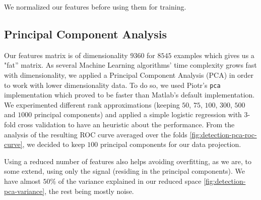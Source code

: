 \documentclass[10pt,a4paper]{article}
\begin{document}
  We normalized our features before using them for training.

  \subsection{Principal Component Analysis}
  Our features matrix is of dimensionality $9360$ for $8545$ examples which gives us a "fat'' matrix. As several Machine Learning algorithms' time complexity grows fast with dimensionality, we applied a Principal Component Analysis (PCA) in order to work with lower dimensionality data. To do so, we used Piotr's \texttt{pca} implementation which proved to be faster than Matlab's default implementation. We experimented different rank approximations (keeping $50$, $75$, $100$, $300$, $500$ and $1000$ principal components) and applied a simple logistic regression with 3-fold cross validation to have an heuristic about the performance. From the analysis of the resulting ROC curve averaged over the folds \ref{fig:detection-pca-roc-curve}, we decided to keep $100$ principal components for our data projection.

  Using a reduced number of features also helps avoiding overfitting, as we are, to some extend, using only the signal (residing in the principal components). We have almost $50\%$ of the variance explained in our reduced space \ref{fig:detection-pca-variance}, the rest being mostly noise.
\end{document}
